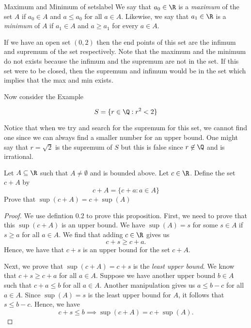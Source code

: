 \begin{definition}{Maximum and Minimum of sets}{label}
        We say that \( a_0 \in \R \) is a \textit{maximum} of the set \( A \) if \( a_0 \in A \) and \( a \leq a_0 \) for all \( a \in A \). Likewise, we say that \(a_1 \in \R \) is a \textit{minimum} of \( A \) if \( a_1 \in A \) and \( a \geq a_1 \) for every \( a \in A \).  
    \end{definition}

If we have an open set \( (0,2) \) then the end points of this set are the infimum and supremum of the set respectively. Note that the maximum and the minimum do not exists because the infimum and the supremum are not in the set. If this set were to be closed, then the supremum and infimum would be in the set which implies that the max and min exists. 

Now consider the Example

\[ S = \{ r \in \Q: r^2 < 2 \} \]

Notice that when we try and search for the supremum for this set, we cannot find one since we can always find a smaller number for an upper bound. One might say that \( r = \sqrt{2} \) is the supremum of \( S \) but this is false since \( r \not\in \Q \) and is irrational. 


    Let \( A \subseteq \R \) such that \( A \neq \emptyset \) and is bounded above. Let \( c \in \R \). Define the set 
    \( c + A \) by 
    \[ c + A = \{ c + a: a \in A  \}  \] 
    Prove that \( \sup(c+A) = c + \sup(A) \) 

    \begin{proof}
        We use defintion 0.2 to prove this proposition. First, we need to prove that this \( \sup(c + A) \) is an upper bound. We have \( \sup(A) = s \) for some \( s \in A \) if \( s \geq a \) for all \( a \in A \). We find that adding \( c \in \R \) gives us
        \[  c+s \geq c + a.\]
        Hence, we have that \( c + s \) is an upper bound for the set \( c + A \). 

        Next, we prove that \( \sup(c+ A) = c + s \) is the \textit{least upper bound}. We know that \( c + s \geq c + a \) for all \( a \in A \). Suppose we have another upper bound \( b \in A \) such that \( c + a \leq b \) for all \( a \in A \). Another manipulation gives us \( a \leq b - c \) for all \( a \in A \). Since \( \sup(A) = s \) is the least upper bound for \( A \), it follows that 
        \( s \leq b - c \). Hence, we have 
        \[ c+s \leq b \implies \sup(c+A) = c + \sup(A). \]
    \end{proof}

